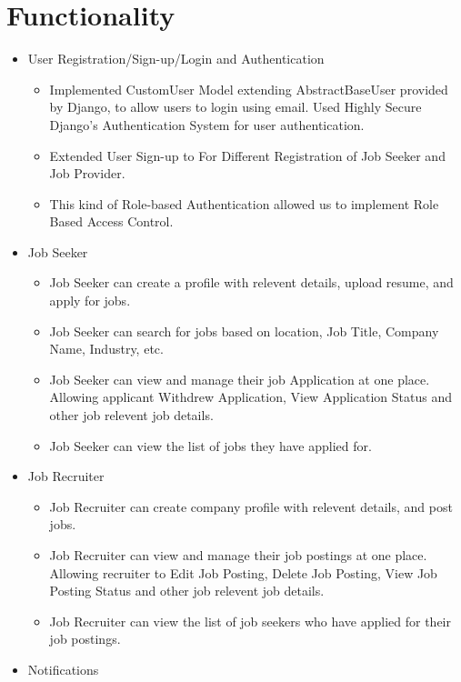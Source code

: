 \documentclass[12pt]{article}
\begin{document}
\section*{Functionality}
\begin{itemize}
    \item User Registration/Sign-up/Login and Authentication
    \begin{itemize}
        \item Implemented CustomUser Model extending AbstractBaseUser provided by Django, to allow users to login using email. Used Highly Secure Django's Authentication System for user authentication.
        \item Extended User Sign-up to For Different Registration of Job Seeker and Job Provider.
        \item This kind of Role-based Authentication allowed us to implement Role Based Access Control.
    \end{itemize}
    \item Job Seeker
    \begin{itemize}
        \item Job Seeker can create a profile with relevent details, upload resume, and apply for jobs.
        \item Job Seeker can search for jobs based on location, Job Title, Company Name, Industry, etc.
        \item Job Seeker can view and manage their job Application at one place. Allowing applicant Withdrew Application, View Application Status and other job relevent job details.
        \item Job Seeker can view the list of jobs they have applied for.
    \end{itemize}
    \item Job Recruiter
    \begin{itemize}
        \item Job Recruiter can create company profile with relevent details, and post jobs.
        \item Job Recruiter can view and manage their job postings at one place. Allowing recruiter to Edit Job Posting, Delete Job Posting, View Job Posting Status and other job relevent job details.
        \item Job Recruiter can view the list of job seekers who have applied for their job postings.
    \end{itemize}
    \item Notifications
    \begin{itemize}

\end{itemize}
\end{itemize}
\end{document}
